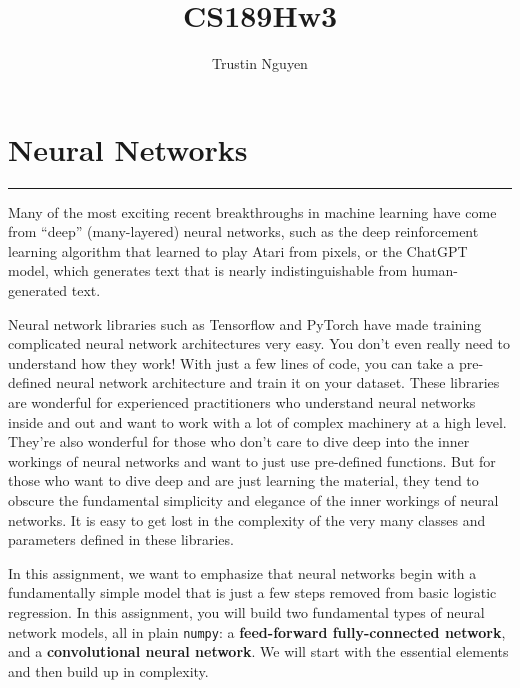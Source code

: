 \documentclass{article}
\title{CS189Hw3}
\author{Trustin Nguyen}
\begin{document}
    \maketitle

\reversemarginpar

\section*{Neural Networks}
\hrule

Many of the most exciting recent breakthroughs in machine learning have come from ``deep'' (many-layered) neural networks, such as the deep reinforcement learning algorithm that learned to play Atari from pixels, or the ChatGPT model, which generates text that is nearly indistinguishable from human-generated text.

Neural network libraries such as Tensorflow and PyTorch have made training complicated neural network architectures very easy. You don’t even really need to understand how they work! With just a few lines of code, you can take a pre-defined neural network architecture and train it on your dataset. These libraries are wonderful for experienced practitioners who understand neural networks inside and out and want to work with a lot of complex machinery at a high level. They’re also wonderful for those who don’t care to dive deep into the inner workings of neural networks and want to just use pre-defined functions. But for those who want to dive deep and are just learning the material, they tend to obscure the fundamental simplicity and elegance of the inner workings of neural networks. It is easy to get lost in the complexity of the very many classes and parameters defined in these libraries.

In this assignment, we want to emphasize that neural networks begin with a fundamentally simple model that is just a few steps removed from basic logistic regression. In this assignment, you will build two fundamental types of neural network models, all in plain \texttt{numpy}: a \textbf{feed-forward fully-connected network}, and a \textbf{convolutional neural network}. We will start with the essential elements and then build up in complexity.
\end{document}
